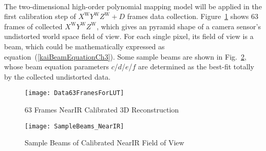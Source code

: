 \\\indent
%
The two-dimensional high-order polynomial mapping model will be applied in the first calibration step of \(X^\text{W}Y^\text{W}Z^\text{W}+D\) frames data collection. Figure~\ref{Data63FranesForLUT} shows 63 frames of collected \(X^\text{W}Y^\text{W}Z^\text{W}\), which gives an pyramid shape of a camera sensor's undistorted world space field of view. For each single pixel, its field of view is a beam, which could be mathematically expressed as equation~(\ref{kaiBeamEquationCh3}). Some sample beams are shown in Fig.~\ref{SampleBeams_NearIR}, whose beam equation parameters \(c\)/\(d\)/\(e\)/\(f\) are determined as the best-fit totally by the collected undistorted data. 
\begin{figure}[t]
\centering
\texttt{[image: Data63FranesForLUT]}
\caption{63 Frames NearIR Calibrated 3D Reconstruction}
\label{Data63FranesForLUT}
\end{figure}%
%
%
\begin{figure}[t]
\centering
\texttt{[image: SampleBeams\_NearIR]}
\caption{Sample Beams of Calibrated NearIR Field of View}
\label{SampleBeams_NearIR}
\end{figure}
%

